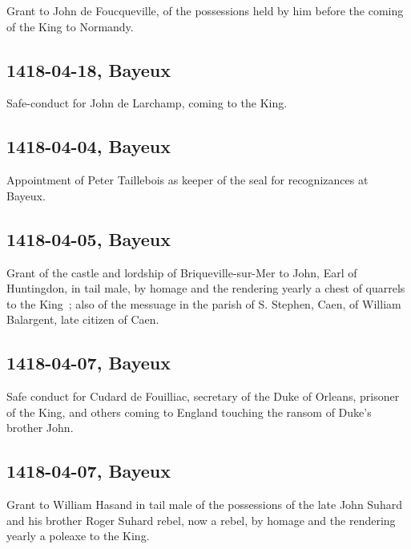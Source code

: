 \documentclass[a4paper,12pt,twoside]{book}
\begin{document}
                  Grant to John de Foucqueville, of the possessions held by him before the coming of the King to Normandy.
               
            \subsection{1418-04-18, Bayeux}
            
                  Safe-conduct for John de Larchamp, coming to the King.
               
            \subsection{1418-04-04, Bayeux}
            
                  Appointment of Peter Taillebois as keeper of the seal for recognizances at Bayeux.
               
            \subsection{1418-04-05, Bayeux}
            
                  Grant of the castle and lordship of Briqueville-sur-Mer to John, Earl of Huntingdon, in tail male, by homage and the rendering yearly a chest of quarrels to the King ; also of the messuage in the parish of S. Stephen, Caen, of William Balargent, late citizen of Caen.
               
            \subsection{1418-04-07, Bayeux}
            
                     Safe conduct for Cudard de Fouilliac, secretary of the Duke of Orleans, prisoner of the King, and others coming to England touching the ransom of Duke's brother John.
                  
            \subsection{1418-04-07, Bayeux}
            
                     Grant to William Hasand in tail male of the possessions of the late John Suhard and his brother Roger Suhard rebel, now a rebel, by homage and the rendering yearly a poleaxe to the King.
                  
\end{document}
